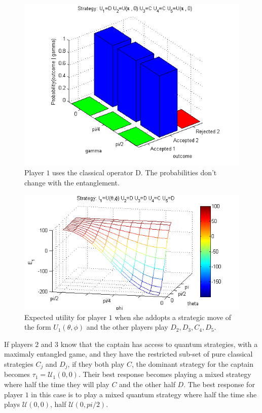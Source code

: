 \begin{table}[h]
\begin{figure}[h]
\centering 
\includegraphics[scale=0.80]{Figures/1.5qubit/DUpi0CCUpi0.png}
\caption{Player $1$ uses the classical operator D. The probabilities don't change with the entanglement.  }
\label{fig:pg_3players_99_0_1:2}
\end{figure}

\begin{figure}[h]
\centering 
\includegraphics[scale=0.80]{Figures/1.5qubit/meanpirate.png}
\caption{Expected utility for player $1$ when she addopts a strategic move of the form $U_{1}(\theta,\phi)$ and the other players play $D_{2},D_{3},C_{4},D_{5}$. }
\label{fig:pg_3players_99_0_1:4}
\end{figure}

If players $2$ and $3$ know that the captain has access to quantum strategies, with a maximaly entangled game, and they have the restricted sub-set of pure classical strategies $C_{j}$ and $D_{j}$, if they both play $C$, the dominant strategy for the captain becomes $\tau_{1} = \mathcal{U}_{1}(0,0)$. Their best response becomes playing a mixed strategy where half the time they will play $C$ and the other half $D$. The best response for player $1$ in this case is to play a mixed quantum strategy where half the time she plays $\mathcal{U}(0,0)$, half $\mathcal{U}(0,pi/2)$.




\end{table}
